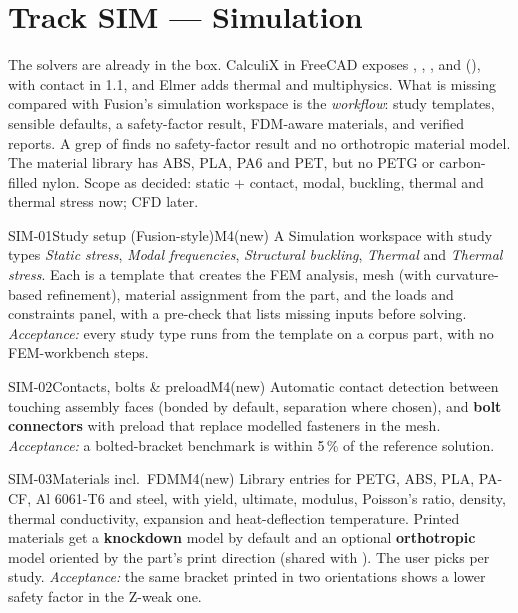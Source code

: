 \section{Track SIM --- Simulation}\label{sec:sim}

The solvers are already in the box. CalculiX in FreeCAD exposes , ,
,  and  (), with contact in
1.1, and Elmer adds thermal and multiphysics. What is missing compared with Fusion's simulation workspace is
the \emph{workflow}: study templates, sensible defaults, a safety-factor result, FDM-aware materials, and
verified reports. A grep of  finds no safety-factor result and no orthotropic material
model. The material library has ABS, PLA, PA6 and PET, but no PETG or carbon-filled nylon.
Scope as decided: static + contact, modal, buckling, thermal and thermal stress now; CFD later.

\begin{epic}{SIM-01}{Study setup (Fusion-style)}{M4}{\stTodo}{(new)}
A Simulation workspace with study types \emph{Static stress}, \emph{Modal frequencies},
\emph{Structural buckling}, \emph{Thermal} and \emph{Thermal stress}. Each is a template that creates the
FEM analysis, mesh (with curvature-based refinement), material assignment from the part, and the loads and
constraints panel, with a pre-check that lists missing inputs before solving.
\emph{Acceptance:} every study type runs from the template on a corpus part, with no FEM-workbench steps.
\end{epic}

\begin{epic}{SIM-02}{Contacts, bolts \& preload}{M4}{\stTodo}{(new)}
Automatic contact detection between touching assembly faces (bonded by default, separation where chosen),
and \textbf{bolt connectors} with preload that replace modelled fasteners in the mesh.
\emph{Acceptance:} a bolted-bracket benchmark is within 5\,\% of the reference solution.
\end{epic}

\begin{epic}{SIM-03}{Materials incl.\ FDM}{M4}{\stTodo}{(new)}
Library entries for PETG, ABS, PLA, PA-CF, Al 6061-T6 and steel, with yield, ultimate, modulus,
Poisson's ratio, density, thermal conductivity, expansion and heat-deflection temperature. Printed materials get
a \textbf{knockdown} model by default and an optional \textbf{orthotropic} model oriented by the part's print
direction (shared with ). The user picks per study.
\emph{Acceptance:} the same bracket printed in two orientations shows a lower safety factor in the Z-weak one.
\end{epic}

